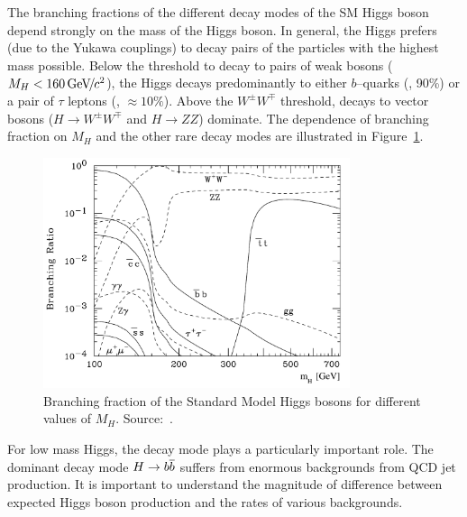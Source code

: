 The branching fractions of the different decay modes of the SM Higgs boson
depend strongly on the mass of the Higgs boson.  In general, the Higgs prefers
(due to the Yukawa couplings) to decay pairs of the particles with the highest
mass possible.  Below the threshold to decay to pairs of weak bosons ($M_H <
160 {\,\text{Ge\hspace{-.08em}V\hspace{-0.16em}/\hspace{-0.08em}}c^\text{2}}$), the Higgs decays predominantly to either $b$--quarks (\bbbar,
90\%) or a pair of $\tau$ leptons (\TT, $\approx 10\%$).  Above the $W^\pm W^\mp$
threshold, decays to vector bosons ($H \to W^\pm W^\mp$ and $H \to ZZ$)
dominate.  The dependence of branching fraction on $M_H$ and the other rare
decay modes are illustrated in Figure~\ref{fig:SMHiggsBR}.  
\begin{figure}
  \centering
  \includegraphics[width=90mm,angle=0]{theory_chapter/figures/smhiggsbr2_mh.pdf}
  \caption[SM Higgs branching fractions]{Branching fraction of the Standard
  Model Higgs bosons for different values of $M_H$. Source:~\cite{PDG}.}
  \label{fig:SMHiggsBR}
\end{figure}
For low mass Higgs,
the \TT decay mode plays a particularly important role.  The dominant decay mode
$H \to {b\overline{b}}$ suffers from enormous backgrounds from QCD jet production.
It is important to understand the magnitude of difference between expected Higgs
boson production and the rates of various backgrounds.

